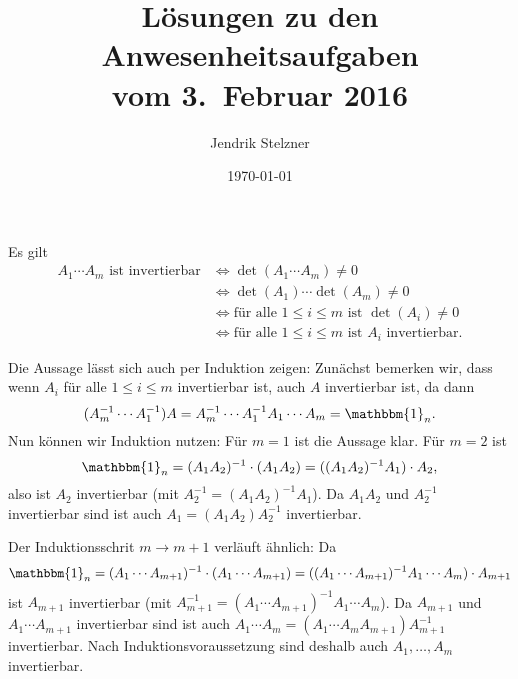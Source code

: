 \documentclass[a4paper,10pt]{article}
\title{Lösungen zu den \\ An\-we\-sen\-heits\-auf\-ga\-ben \\ vom 3.\ Februar 2016}
\author{Jendrik Stelzner}
\date{\today}
\begin{document}
\maketitle





\section{}
Es gilt
\begin{align*}
 \text{$A_1 \dotsm A_m$ ist invertierbar}
 &\iff \det(A_1 \dotsm A_m) \neq 0 \\
 &\iff \det(A_1) \dotsm \det(A_m) \neq 0 \\
 &\iff \text{für alle $1 \leq i \leq m$ ist $\det(A_i) \neq 0$} \\
 &\iff \text{für alle $1 \leq i \leq m$ ist $A_i$ invertierbar}.
\end{align*}

Die Aussage lässt sich auch per Induktion zeigen: Zunächst bemerken wir, dass wenn $A_i$ für alle $1 \leq i \leq m$ invertierbar ist, auch $A$ invertierbar ist, da dann
\[
 (A_m^{-1} \dotsm A_1^{-1}) A
 = A_m^{-1} \dotsm A_1^{-1} A_1 \dotsm A_m
 = \mathbbm{1}_n.
\]
Nun können wir Induktion nutzen: Für $m = 1$ ist die Aussage klar. Für $m = 2$ ist
\[
 \mathbbm{1}_n
 = (A_1 A_2)^{-1} \cdot (A_1 A_2)
 = ((A_1 A_2)^{-1} A_1) \cdot A_2,
\]
also ist $A_2$ invertierbar (mit $A_2^{-1} = (A_1 A_2)^{-1} A_1$). Da $A_1 A_2$ und $A_2^{-1}$ invertierbar sind ist auch $A_1 = (A_1 A_2) A_2^{-1}$ invertierbar.

Der Induktionsschrit $m \to m+1$ verläuft ähnlich: Da
\[
 \mathbbm{1}_n
 = (A_1 \dotsm A_{m+1})^{-1} \cdot (A_1 \dotsm A_{m+1})
 = ((A_1 \dotsm A_{m+1})^{-1} A_1 \dotsm A_m) \cdot A_{m+1}
\]
ist $A_{m+1}$ invertierbar (mit $A_{m+1}^{-1} = (A_1 \dotsm A_{m+1})^{-1} A_1 \dotsm A_m$). Da $A_{m+1}$ und $A_1 \dotsm A_{m+1}$ invertierbar sind ist auch $A_1 \dotsm A_m = (A_1 \dotsm A_m A_{m+1}) A_{m+1}^{-1}$ invertierbar. Nach Induktionsvoraussetzung sind deshalb auch $A_1, \dotsc, A_m$ invertierbar.





\section{}
\end{document}
